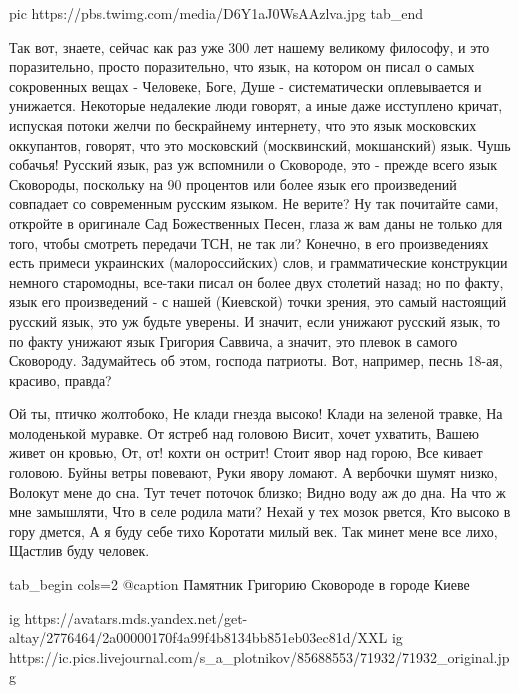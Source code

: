 		 pic https://pbs.twimg.com/media/D6Y1aJ0WsAAzlva.jpg
  tab_end
\fi

Так вот, знаете, сейчас как раз уже 300 лет нашему
великому философу, и это поразительно, просто поразительно, что язык, на
котором он писал о самых сокровенных вещах - Человеке, Боге, Душе -
систематически оплевывается и унижается. Некоторые недалекие люди говорят, а
иные даже исступлено кричат, испуская потоки желчи по бескрайнему интернету,
что это язык московских оккупантов, говорят, что это московский (москвинский,
мокшанский) язык. Чушь собачья! Русский язык, раз уж вспомнили о Сковороде, это
- прежде всего язык Сковороды, поскольку на 90 процентов или более язык его
произведений совпадает со современным русским языком. Не верите? Ну так
почитайте сами, откройте в оригинале Сад Божественных Песен, глаза ж вам даны
не только для того, чтобы смотреть передачи ТСН, не так ли? Конечно, в его
произведениях есть примеси украинских (малороссийских) слов, и грамматические
конструкции немного старомодны, все-таки писал он более двух столетий назад; но
по факту, язык его произведений - с нашей (Киевской) точки зрения, это самый настоящий русский язык, это уж
будьте уверены. И значит, если унижают русский язык, то по факту унижают язык
Григория Саввича, а значит, это плевок в самого Сковороду.  Задумайтесь об
этом, господа патриоты. Вот, например, песнь 18-ая, красиво, правда?

\raggedcolumns
\begin{multicols}{2} %
\setlength{\parindent}{0pt}
\obeycr
Ой ты, птичко жолтобоко,
Не клади гнезда высоко!
Клади на зеленой травке,
На молоденькой муравке.
\smallskip
От ястреб над головою
Висит, хочет ухватить,
Вашею живет он кровью,
От, от! кохти он острит!
\smallskip
Стоит явор над горою,
Все кивает головою.
Буйны ветры повевают,
Руки явору ломают.
\smallskip
А вербочки шумят низко,
Волокут мене до сна.
Тут течет поточок близко;
Видно воду аж до дна.
\smallskip
На что ж мне замышляти,
Что в селе родила мати?
Нехай у тех мозок рвется,
Кто высоко в гору дмется,
\smallskip
А я буду себе тихо
Коротати милый век.
\smallskip
Так минет мене все лихо,
Щастлив буду человек.
\restorecr
\end{multicols} %

\ifcmt
tab_begin cols=2
  @caption Памятник Григорию Сковороде в городе Киеве

  ig https://avatars.mds.yandex.net/get-altay/2776464/2a00000170f4a99f4b8134bb851eb03ec81d/XXL
	ig https://ic.pics.livejournal.com/s_a_plotnikov/85688553/71932/71932_original.jpg

